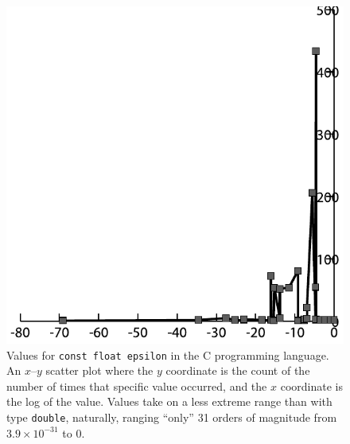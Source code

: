 \documentclass[twocolumn]{article}
\begin{document}
\begin{figure}[ht]
\begin{center}
\includegraphics[width=0.99 \linewidth]{chart-c-float}
\end{center}\vspace{-0.1in}
\caption{ Values for {\tt const float epsilon} in the C programming
  language. An $x$--$y$ scatter plot where the $y$ coordinate is the
  count of the number of times that specific value occurred, and the
  $x$ coordinate is the log of the value. Values take on a less
  extreme range than with type {\tt double}, naturally, ranging ``only''
  31 orders of magnitude from $3.9 \times 10^{-31}$ to $0$.}
\label{fig:cfloat}
\end{figure}
\end{document}
